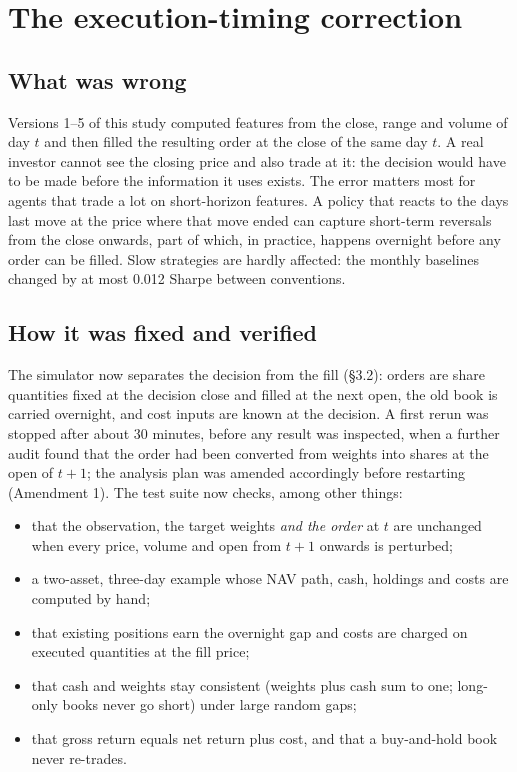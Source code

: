 \documentclass[11pt]{article}
\providecommand{\tightlist}{\setlength{\itemsep}{0pt}\setlength{\parskip}{0pt}}
\begin{document}
\section{The execution-timing correction}\label{s5}

\subsection{What was wrong}\label{what-was-wrong}

Versions 1--5 of this study computed features from the close, range and volume of day \(t\) and then filled the resulting order at the close of the same day \(t\). A real investor cannot see the closing price and also trade at it: the decision would have to be made before the information it uses exists. The error matters most for agents that trade a lot on short-horizon features. A policy that reacts to the day\textquotesingle s last move at the price where that move ended can capture short-term reversals from the close onwards, part of which, in practice, happens overnight before any order can be filled. Slow strategies are hardly affected: the monthly baselines changed by at most 0.012 Sharpe between conventions.

\subsection{How it was fixed and verified}\label{how-it-was-fixed-and-verified}

The simulator now separates the decision from the fill (\S{}3.2): orders are share quantities fixed at the decision close and filled at the next open, the old book is carried overnight, and cost inputs are known at the decision. A first rerun was stopped after about 30 minutes, before any result was inspected, when a further audit found that the order had been converted from weights into shares at the open of \(t+1\); the analysis plan was amended accordingly before restarting (Amendment 1). The test suite now checks, among other things:

\begin{itemize}
\tightlist
\item
  that the observation, the target weights \emph{and the order} at \(t\) are unchanged when every price, volume and open from \(t+1\) onwards is perturbed;
\item
  a two-asset, three-day example whose NAV path, cash, holdings and costs are computed by hand;
\item
  that existing positions earn the overnight gap and costs are charged on executed quantities at the fill price;
\item
  that cash and weights stay consistent (weights plus cash sum to one; long-only books never go short) under large random gaps;
\item
  that gross return equals net return plus cost, and that a buy-and-hold book never re-trades.
\end{itemize}
\end{document}
